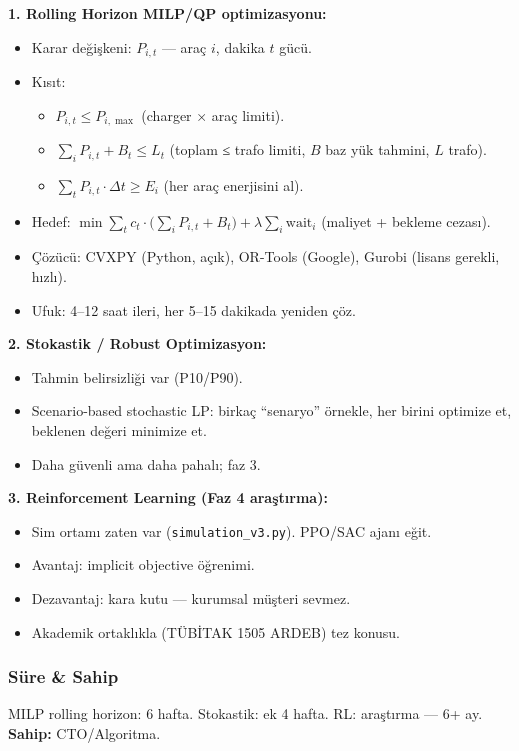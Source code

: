 \documentclass[11pt,a4paper]{article}
\begin{document}
\textbf{1. Rolling Horizon MILP/QP optimizasyonu:}
\begin{itemize}
    \item Karar değişkeni: $P_{i,t}$ — araç $i$, dakika $t$ gücü.
    \item Kısıt:
        \begin{itemize}
            \item $P_{i,t} \le P_{i,\max}$ (charger × araç limiti).
            \item $\sum_i P_{i,t} + B_t \le L_t$ (toplam ≤ trafo limiti, $B$ baz yük tahmini, $L$ trafo).
            \item $\sum_t P_{i,t} \cdot \Delta t \ge E_i$ (her araç enerjisini al).
        \end{itemize}
    \item Hedef: $\min \sum_t c_t \cdot \big(\sum_i P_{i,t} + B_t\big) + \lambda \sum_i \text{wait}_i$ (maliyet + bekleme cezası).
    \item Çözücü: CVXPY (Python, açık), OR-Tools (Google), Gurobi (lisans gerekli, hızlı).
    \item Ufuk: 4--12 saat ileri, her 5--15 dakikada yeniden çöz.
\end{itemize}

\textbf{2. Stokastik / Robust Optimizasyon:}
\begin{itemize}
    \item Tahmin belirsizliği var (P10/P90).
    \item Scenario-based stochastic LP: birkaç ``senaryo'' örnekle, her birini optimize et, beklenen değeri minimize et.
    \item Daha güvenli ama daha pahalı; faz 3.
\end{itemize}

\textbf{3. Reinforcement Learning (Faz 4 araştırma):}
\begin{itemize}
    \item Sim ortamı zaten var (\texttt{simulation\_v3.py}). PPO/SAC ajanı eğit.
    \item Avantaj: implicit objective öğrenimi.
    \item Dezavantaj: kara kutu — kurumsal müşteri sevmez.
    \item Akademik ortaklıkla (TÜBİTAK 1505 ARDEB) tez konusu.
\end{itemize}

\subsubsection{Süre \& Sahip}
MILP rolling horizon: 6 hafta. Stokastik: ek 4 hafta. RL: araştırma — 6+ ay. \textbf{Sahip:} CTO/Algoritma.
\end{document}
